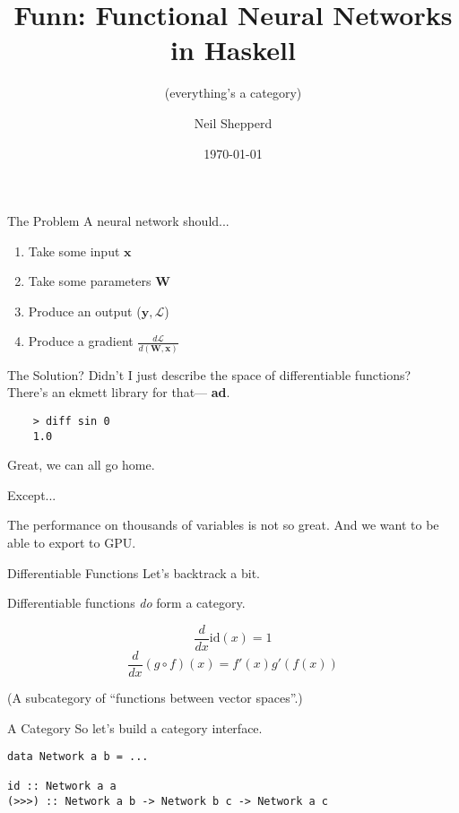 \documentclass[10pt]{beamer}
\title{Funn: Functional Neural Networks in Haskell}
\subtitle{(everything's a category)}
\date{\today}
\author{Neil Shepperd}
\newenvironment{xframe}[1][]{\begin{frame}[fragile,environment=xframe,#1]}{\end{frame}}
\begin{document}
\maketitle

\begin{xframe}{The Problem}
  A neural network should...
  \pause
  \begin{enumerate}
  \item Take some input $\mathbf{x}$ \pause
  \item Take some parameters $\mathbf{W}$ \pause
  \item Produce an output ($\mathbf{y}, \mathcal{L}$) \pause
  \item Produce a gradient $\frac{d\mathcal{L}}{d(\mathbf{W},\mathbf{x})}$
  \end{enumerate}
\end{xframe}

\begin{xframe}{The Solution?}
  Didn't I just describe the space of differentiable functions? \\
  There's an ekmett library for that\texttrademark \pause --- \textbf{ad}.

  \begin{verbatim}
    > diff sin 0
    1.0
  \end{verbatim}

  Great, we can all go home.

  Except...
  \pause

  The performance on thousands of variables is not so great.
  And we want to be able to export to GPU.
\end{xframe}

\begin{xframe}{Differentiable Functions}
  Let's backtrack a bit.

  Differentiable functions \emph{do} form a category.

  \[ \frac{d}{dx} \text{id}(x) = 1 \]
  \[ \frac{d}{dx} (g \circ f)(x) = f'(x) g'(f(x)) \]

  (A subcategory of ``functions between vector spaces''.)
\end{xframe}

\begin{xframe}{A Category}
  So let's build a category interface.

  \begin{verbatim}
data Network a b = ...

id :: Network a a
(>>>) :: Network a b -> Network b c -> Network a c
  \end{verbatim}
\end{xframe}
\end{document}
